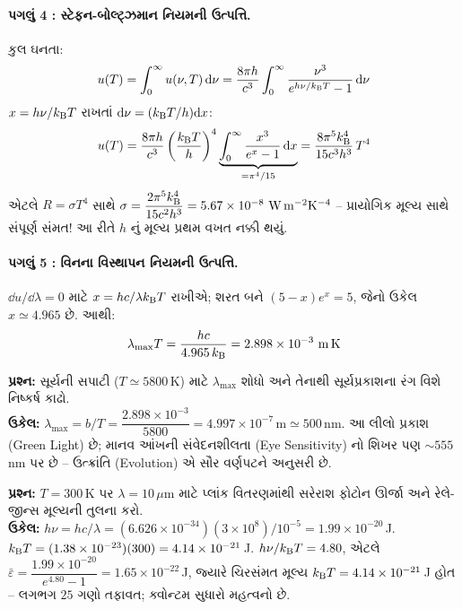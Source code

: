 \paragraph{પગલું 4 : સ્ટેફન-બોલ્ટ્ઝમાન નિયમની ઉત્પત્તિ.} કુલ ઘનતા:
\begin{equation}
  u(T)=\int_0^\infty u(\nu,T)\,\dd\nu
      =\frac{8\pi h}{c^{3}}\int_0^\infty \frac{\nu^{3}}{e^{h\nu/k_{\mathrm{B}} T}-1}\,\dd\nu
\end{equation}
$x=h\nu/k_{\mathrm{B}} T$ રાખતાં $\dd\nu=(k_{\mathrm{B}} T/h)\dd x$:
\begin{equation}
  u(T)=\frac{8\pi h}{c^{3}}\left(\frac{k_{\mathrm{B}} T}{h}\right)^{4}
       \underbrace{\int_0^\infty \frac{x^{3}}{e^{x}-1}\,\dd x}_{=\pi^{4}/15}
       =\frac{8\pi^{5}k_{\mathrm{B}}^{4}}{15 c^{3}h^{3}}\,T^{4}
\end{equation}
એટલે $R=\sigma T^{4}$ સાથે
$\sigma=\dfrac{2\pi^{5}\kB^{4}}{15c^{2}h^{3}}=5.67\times10^{-8}\ \mathrm{W\,m^{-2}K^{-4}}$ --
પ્રાયોગિક મૂલ્ય સાથે સંપૂર્ણ સંમત! આ રીતે $h$ નું મૂલ્ય પ્રથમ વખત નક્કી થયું.

\paragraph{પગલું 5 : વિનના વિસ્થાપન નિયમની ઉત્પત્તિ.} $\dd u/\dd\lambda=0$ માટે
$x=hc/\lambda k_{\mathrm{B}} T$ રાખીએ; શરત બને $(5-x)e^{x}=5$, જેનો ઉકેલ $x\simeq 4.965$ છે. આથી:
\begin{equation}
  \lambda_{\max}T=\frac{hc}{4.965\,\kB}=2.898\times10^{-3}\ \mathrm{m\,K}
\end{equation}

\begin{udaharan}[1.1]
\textbf{પ્રશ્ન:} સૂર્યની સપાટી ($T\simeq5800\,$K) માટે $\lambda_{\max}$ શોધો અને તેનાથી
સૂર્યપ્રકાશના રંગ વિશે નિષ્કર્ષ કાઢો.\\[1mm]
\textbf{ઉકેલ:} $\lambda_{\max}=b/T=\dfrac{2.898\times10^{-3}}{5800}=4.997\times10^{-7}\,\mathrm{m}\simeq500\,$nm.
આ લીલો પ્રકાશ (Green Light) છે; માનવ આંખની સંવેદનશીલતા (Eye Sensitivity) નો શિખર પણ
$\sim555\,$nm પર છે -- ઉત્ક્રાંતિ (Evolution) એ સૌર વર્ણપટને અનુસરી છે.
\end{udaharan}

\begin{udaharan}[1.2]
\textbf{પ્રશ્ન:} $T=300\,$K પર $\lambda=10\,\mu$m માટે પ્લાંક વિતરણમાંથી સરેરાશ ફોટોન ઊર્જા
અને રેલે-જીન્સ મૂલ્યની તુલના કરો.\\[1mm]
\textbf{ઉકેલ:} $h\nu=hc/\lambda=(6.626\times10^{-34})(3\times10^{8})/10^{-5}
=1.99\times10^{-20}\,$J. $k_{\mathrm{B}} T=(1.38\times10^{-23})(300)=4.14\times10^{-21}\,$J.
$h\nu/k_{\mathrm{B}} T=4.80$, એટલે
$\bar\varepsilon=\dfrac{1.99\times10^{-20}}{e^{4.80}-1}=1.65\times10^{-22}\,$J,
જ્યારે ચિરસંમત મૂલ્ય $k_{\mathrm{B}} T=4.14\times10^{-21}\,$J હોત -- લગભગ $25$ ગણો તફાવત; ક્વોન્ટમ સુધારો
મહત્વનો છે.
\end{udaharan}

